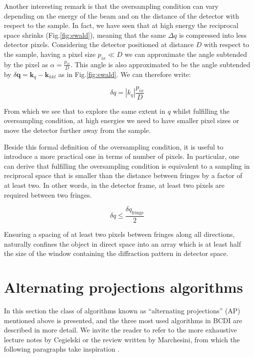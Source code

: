 Another interesting remark is that the oversampling condition can vary depending on the energy of the beam and on the 
distance of the detector with respect to the sample. 
In fact, we have seen that at high energy the reciprocal space shrinks (Fig.\ref{fig:ewald}), meaning that the same $\Delta q$ is compressed 
into less detector pixels. Considering the detector positioned at distance $D$ with respect to the sample, having a pixel 
size $p_{ix} \ll D$ we can approximate the angle subtended by the pixel as $\alpha = \frac{p_{ix}}{D}$. This angle 
is also approximated to be the angle subtended by $\delta \mathbf{q} = \mathbf{k}_{q} - \mathbf{k}_{hkl} $ as in Fig.\ref{fig:ewald}. 
We can therefore write: 

\begin{equation}
    \delta q = |k_{q}|\frac{p_{ix}}{D} 
\end{equation}

From which we see that to explore the same extent in $q$ whilst fulfilling the oversampling condition, at high energies 
we need to have smaller pixel sizes or move the detector further away from the sample. 

Beside this formal definition of the oversampling condition, it is useful to introduce a more practical one in terms of 
number of pixels. In particular, one can derive that fulfilling the oversampling condition is equivalent to a sampling 
in reciprocal space that is smaller than the distance between fringes by a factor of at least two. In other words, 
in the detector frame, at least two pixels are required between two fringes. 

\begin{equation}
    \delta q \leq \frac{\delta q_{\text{fringe}}}{2}
\end{equation}

Ensuring a spacing of at least two pixels between fringes along all directions, naturally confines the 
object in direct space into an array which is at least half the size of the window containing 
the diffraction pattern in detector space. 

\section{Alternating projections algorithms}

In this section the class of algorithms known as ``alternating projections'' (AP) mentioned above is presented, and the three most 
used algorithms in BCDI are described in more detail. We invite the reader to refer to the more exhaustive lecture notes by 
Cegielski \cite{book_iterative2012} or the review written by Marchesini, from which the following paragraphs take 
inspiration \cite{marchesini_unified_2007} .\\

